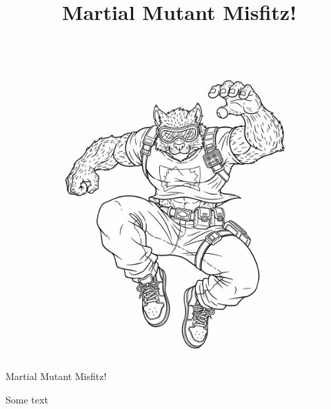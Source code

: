 \documentclass{article}
\title{\Huge\fontspec{TradeWinds-Regular.ttf}Martial Mutant Misfitz!}
\date{}
\begin{document}

\begin{figure}[tph!]
\centering\includegraphics[width=12cm]{images/frontCover.png}
\end{figure}
\Huge{}Martial Mutant Misfitz!

\newpage
{}

\centering Some text
\end{document}
